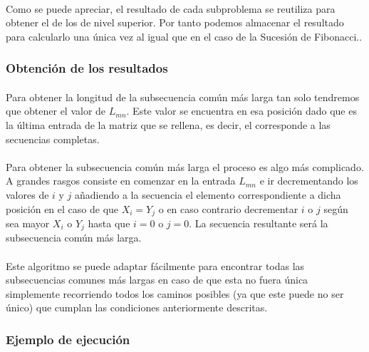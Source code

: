\documentclass{article}
\begin{document}
			\paragraph{}
			Como se puede apreciar, el resultado  de cada subproblema se reutiliza para obtener el de los de nivel superior. Por tanto podemos almacenar el resultado para calcularlo una única vez al igual que en el caso de la Sucesión de Fibonacci..

		\subsubsection{Obtención de los resultados}
		
			\paragraph{}
			Para obtener la longitud de la subsecuencia común más larga tan solo tendremos que obtener el valor de $L_{mn}$. Este valor se encuentra en esa posición dado que es la última entrada de la matriz que se rellena, es decir, el corresponde a las secuencias completas.

			\paragraph{}
			Para obtener la subsecuencia común más larga el proceso es algo más complicado. A grandes rasgos consiste en comenzar en la entrada $L_{mn}$ e ir decrementando los valores de $i$ y $j$ añadiendo a la secuencia el elemento correspondiente a dicha posición en el caso de que $ X_{i} = Y_{j}$ o en caso contrario decrementar $i$ o $j$ según sea mayor $X_{i}$ o  $Y_{j}$ hasta que $i = 0$ o $j = 0$. La secuencia resultante será la subsecuencia común más larga.

			\paragraph{}
			Este algoritmo se puede adaptar fácilmente para encontrar todas las subsecuencias comunes más largas en caso de que esta no fuera única simplemente recorriendo todos los caminos posibles (ya que este puede no ser único) que cumplan las condiciones anteriormente descritas.

		\subsubsection{Ejemplo de ejecución}
\end{document}
